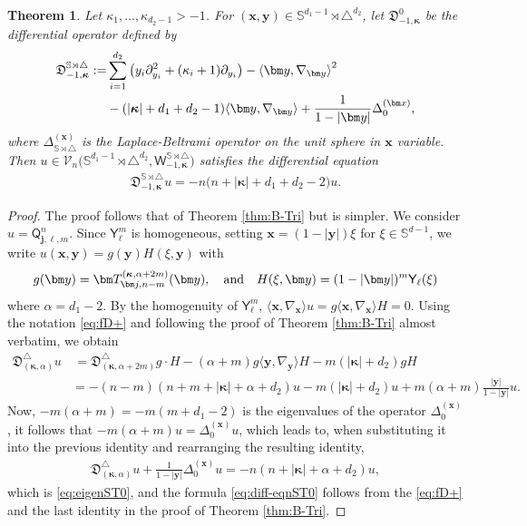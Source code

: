 \documentclass{amsart}
\newtheorem{thm}{Theorem}[section]
\theoremstyle{remark}
\def\la{{\langle}}
\def\ra{{\rangle}}
\def\sph{{\mathbb{S}^{d-1}}}
\def\sQ{{\mathsf Q}}
\def\sW{{\mathsf W}}
\def\sY{{\mathsf Y}}
\def\fD{{\mathfrak D}}
\def\a{{\alpha}}
\def\k{{\kappa}}
\def\la{{\langle}}
\def\ra{{\rangle}}
\def\xb{{\bm x}}
\def\CV{{\mathcal V}}
\def\SS{{\mathbb S}}
\def\bk{{\boldsymbol{\kappa}}}
\begin{document}
\begin{thm}
Let  $\k_1,\ldots, \k_{d_2-1} > -1$. For $(\bm x,\bm y) \in \SS^{d_1-1} \!\rtimes \triangle^{d_2}$, 
let $\fD_{-1,\bk}^{0}$ be the differential operator defined by 
\begin{align}\label{eq:diff-eqnST0}
  \fD_{-1,\bk}^{\SS \rtimes \triangle} : = &  
    \sum_{i=1}^{d_2} \left( y_i \partial_{y_i}^2 + (\kappa_i +1) \partial_{y_i} \right) - \la \bm y, \nabla_{\bm y} \ra^2 \\
         & - (|\bk| +d_1+d_2-1) \la \bm y, \nabla_{\bm y} \ra 
           + \frac{1}{1-|\bm y|} \Delta_0^{(\bm x)}, \notag
\end{align}
where $\Delta_{\SS \rtimes \triangle}^{(\bm x)}$ is the Laplace-Beltrami operator on the unit sphere in $\bm x$ variable. 
Then $u \in \CV_n\big(\SS^{d_1-1} \!\rtimes \triangle^{d_2}, \sW_{-1, \bk}^{\SS \rtimes \triangle}\big)$ satisfies the 
differential equation 
\begin{align}\label{eq:eigenST0}
             \fD_{-1,\bk}^{\SS \rtimes \triangle} u = - n \big( n+ | \bk| + d_1 +d_2 -2 \big)u.
\end{align}
\end{thm}

\begin{proof}
The proof follows that of Theorem \ref{thm:B-Tri}  but is simpler. We consider $u =\sQ_{\bm j, \ell, m}^n$. Since 
$\sY_\ell^m$ is homogeneous, setting $\bm x = (1-|\bm y|) \xi$ for $\xi \in \sph$, we write 
$u(\bm x, \bm y) = g(\bm y) H(\xi, \bm y)$ with 
$$
   g(\bm y) = \bm T_{\bm j, n-m}^{(\bk, \alpha +2m)} (\bm y), \quad \hbox{and}\quad
      H(\xi, \bm y) =   (1-|\bm y|)^m \sY_\ell(\xi)
$$
where $\a = d_1-2$. By the homogenuity of $\sY_\ell^m$, $\la \xb, \nabla_\xb\ra u = g \la \xb, \nabla_\xb\ra  H = 0$. 
Using the notation \eqref{eq:fD+} and following the proof of Theorem \ref{thm:B-Tri} 
almost verbatim, we obtain 
\begin{align*}
\fD_{(\bk, \a)}^\triangle u  &\, = \fD_{(\bk, \a+2 m )}^\triangle g \cdot H - (\a + m) g \la \bm y, \nabla_{\bm y} \ra H  
     - m (|\bk| +d_2) g H \\
 & =  - (n-m) (n+ m + |\bk|+ \a +d_2) u - m  (|\bk|+ d_2) u + m(\a+m) \frac{|\bm y|}{1- |\bm y|} u.
\end{align*}
Now, $- m(\a+m) = - m(m+d_1-2)$ is the eigenvalues of the operator $\Delta_0^{(\bm x)}$, it follows that 
$ - m(\a+m) u = \Delta_0^{(\bm x)} u$, which leads to, when substituting it into the previous identity and rearranging
the resulting identity,  
\begin{align} \label{eq:diffST0}
\fD_{(\bk, \a)}^\triangle u + \frac1{1-|\bm y|} \Delta_0^{(\bm x)} u =  - n (n + |\bk | + \a +d_2) u,
\end{align}
which is \eqref{eq:eigenST0}, and the formula \eqref{eq:diff-eqnST0} follows from the \eqref{eq:fD+} and the last 
identity in the proof of Theorem  \ref{thm:B-Tri}.  
\end{proof}
\end{document}

